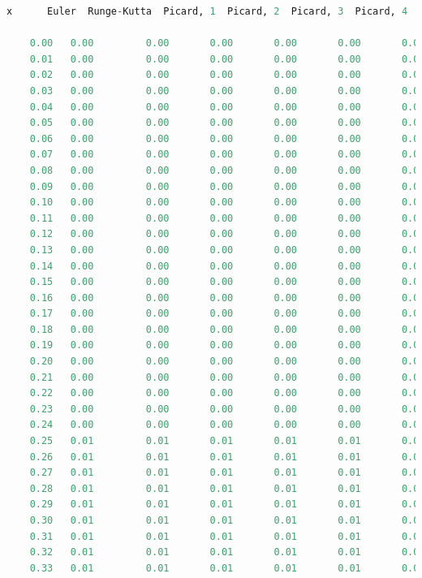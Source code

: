 \documentclass[12pt]{report}
\begin{document}
\begin{lstlisting}[language=Python]
	x      Euler  Runge-Kutta  Picard, 1  Picard, 2  Picard, 3  Picard, 4
                                                                  
	0.00   0.00         0.00       0.00       0.00       0.00       0.00
	0.01   0.00         0.00       0.00       0.00       0.00       0.00
	0.02   0.00         0.00       0.00       0.00       0.00       0.00
	0.03   0.00         0.00       0.00       0.00       0.00       0.00
	0.04   0.00         0.00       0.00       0.00       0.00       0.00
	0.05   0.00         0.00       0.00       0.00       0.00       0.00
	0.06   0.00         0.00       0.00       0.00       0.00       0.00
	0.07   0.00         0.00       0.00       0.00       0.00       0.00
	0.08   0.00         0.00       0.00       0.00       0.00       0.00
	0.09   0.00         0.00       0.00       0.00       0.00       0.00
	0.10   0.00         0.00       0.00       0.00       0.00       0.00
	0.11   0.00         0.00       0.00       0.00       0.00       0.00
	0.12   0.00         0.00       0.00       0.00       0.00       0.00
	0.13   0.00         0.00       0.00       0.00       0.00       0.00
	0.14   0.00         0.00       0.00       0.00       0.00       0.00
	0.15   0.00         0.00       0.00       0.00       0.00       0.00
	0.16   0.00         0.00       0.00       0.00       0.00       0.00
	0.17   0.00         0.00       0.00       0.00       0.00       0.00
	0.18   0.00         0.00       0.00       0.00       0.00       0.00
	0.19   0.00         0.00       0.00       0.00       0.00       0.00
	0.20   0.00         0.00       0.00       0.00       0.00       0.00
	0.21   0.00         0.00       0.00       0.00       0.00       0.00
	0.22   0.00         0.00       0.00       0.00       0.00       0.00
	0.23   0.00         0.00       0.00       0.00       0.00       0.00
	0.24   0.00         0.00       0.00       0.00       0.00       0.00
	0.25   0.01         0.01       0.01       0.01       0.01       0.01
	0.26   0.01         0.01       0.01       0.01       0.01       0.01
	0.27   0.01         0.01       0.01       0.01       0.01       0.01
	0.28   0.01         0.01       0.01       0.01       0.01       0.01
	0.29   0.01         0.01       0.01       0.01       0.01       0.01
	0.30   0.01         0.01       0.01       0.01       0.01       0.01
	0.31   0.01         0.01       0.01       0.01       0.01       0.01
	0.32   0.01         0.01       0.01       0.01       0.01       0.01
	0.33   0.01         0.01       0.01       0.01       0.01       0.01

\end{lstlisting}
\end{document}
